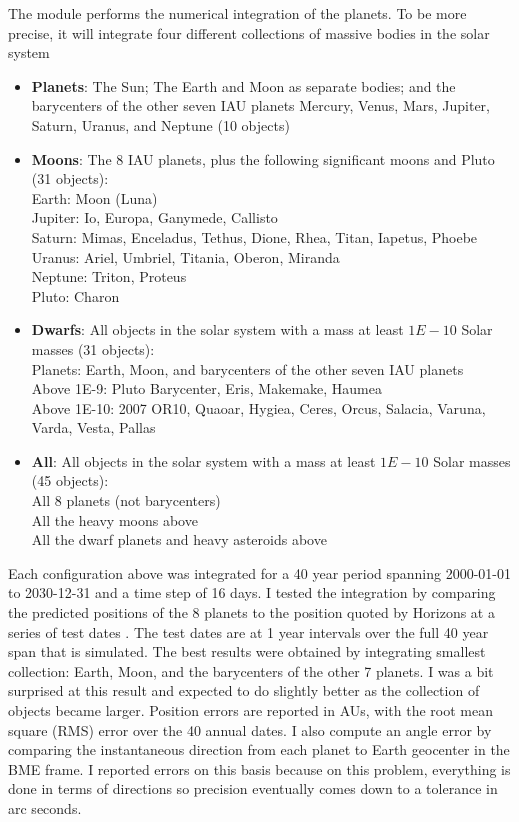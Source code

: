 The module  performs the numerical integration of the planets.
To be more precise, it will integrate four different collections of massive bodies in the solar system
\begin{itemize}
\item \textbf{Planets}: The Sun; The Earth and Moon as separate bodies; and the barycenters of the other seven IAU planets 
Mercury, Venus, Mars, Jupiter, Saturn, Uranus, and Neptune (10 objects)
\item \textbf{Moons}: The 8 IAU planets, plus the following significant moons and Pluto (31 objects): \\
Earth: Moon (Luna)\\
Jupiter: Io, Europa, Ganymede, Callisto \\
Saturn: Mimas, Enceladus, Tethus, Dione, Rhea, Titan, Iapetus, Phoebe \\
Uranus: Ariel, Umbriel, Titania, Oberon, Miranda \\
Neptune: Triton, Proteus \\
Pluto: Charon 
\item \textbf{Dwarfs}: All objects in the solar system with a mass at least $1E-10$ Solar masses (31 objects): \\
Planets: Earth, Moon, and barycenters of the other seven IAU planets \\
Above 1E-9: Pluto Barycenter, Eris, Makemake, Haumea \\
Above 1E-10: 2007 OR10, Quaoar, Hygiea, Ceres, Orcus, Salacia, Varuna, Varda, Vesta, Pallas
\item \textbf{All}: All objects in the solar system with a mass at least $1E-10$ Solar masses (45 objects): \\
All 8 planets (not barycenters) \\
All the heavy moons above \\
All the dwarf planets and heavy asteroids above
\end{itemize}

Each configuration above was integrated for a 40 year period spanning 2000-01-01 to 2030-12-31 and a time step of 16 days.
I tested the integration by comparing the predicted positions of the 8 planets to the position quoted by Horizons at a series of test dates .
The test dates are at 1 year intervals over the full 40 year span that is simulated.
The best results were obtained by integrating smallest collection: Earth, Moon, and the barycenters of the other 7 planets.
I was a bit surprised at this result and expected to do slightly better as the collection of objects became larger.
Position errors are reported in AUs, with the root mean square (RMS) error over the 40 annual dates.
I also compute an angle error by comparing the instantaneous direction from each planet to Earth geocenter in the BME frame.
I reported errors on this basis because on this problem, everything is done in terms of directions so precision eventually
comes down to a tolerance in arc seconds.

